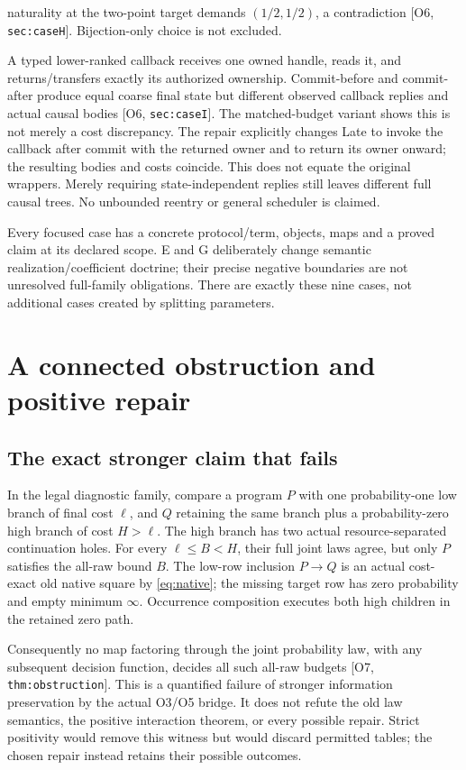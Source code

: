 \documentclass[11pt,a4paper]{article}
\theoremstyle{definition}
\newcommand{\Addr}[2]{\textup{[#1, \texttt{#2}]}}
\begin{document}
\begin{description}[style=nextline]
naturality at the two-point target demands \((1/2,1/2)\), a contradiction
\Addr{O6}{sec:caseH}. Bijection-only choice is not excluded.
\item[I Callback commit timing.]
A typed lower-ranked callback receives one owned handle, reads it, and
returns/transfers exactly its authorized ownership. Commit-before and
commit-after produce equal coarse final state but different observed
callback replies and actual causal bodies \Addr{O6}{sec:caseI}.
The matched-budget variant shows this is not merely a cost discrepancy.
The repair explicitly changes Late to invoke the callback after commit
with the returned owner and to return its owner onward; the resulting
bodies and costs coincide. This does not equate the original wrappers.
Merely requiring state-independent replies still leaves different full
causal trees. No unbounded reentry or general scheduler is claimed.
\end{description}
Every focused case has a concrete protocol/term, objects, maps and a
proved claim at its declared scope. E and G deliberately change semantic
realization/coefficient doctrine; their precise negative boundaries are
not unresolved full-family obligations. There are exactly these nine
cases, not additional cases created by splitting parameters.

\section{A connected obstruction and positive repair}\label{sec:repair}

\subsection{The exact stronger claim that fails}
In the legal diagnostic family, compare a program \(P\) with one
probability-one low branch of final cost \(\ell\), and \(Q\) retaining
the same branch plus a probability-zero high branch of cost \(H>\ell\).
The high branch has two actual resource-separated continuation holes.
For every \(\ell\le B<H\), their full joint laws agree, but only
\(P\) satisfies the all-raw bound \(B\). The low-row inclusion
\(P\to Q\) is an actual cost-exact old native square by
\eqref{eq:native}; the missing target row has zero probability and empty
minimum \(\infty\). Occurrence composition executes both high children
in the retained zero path.

Consequently no map factoring through the joint probability law, with
any subsequent decision function, decides all such all-raw budgets
\Addr{O7}{thm:obstruction}. This is a quantified failure of stronger
information preservation by the actual O3/O5 bridge. It does not refute
the old law semantics, the positive interaction theorem, or every possible
repair. Strict positivity would remove this witness but would discard
permitted tables; the chosen repair instead retains their possible outcomes.
\end{document}
